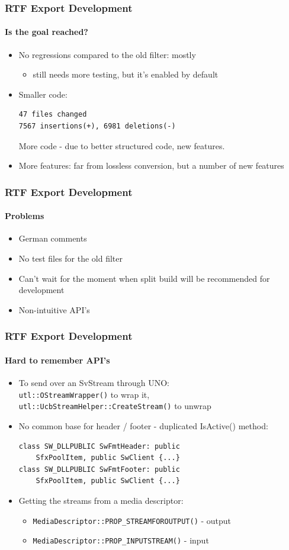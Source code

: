 \documentclass[hyperref={pdfpagelabels=false}]{beamer}
\begin{document}
\begin{frame}[fragile]
\frametitle{RTF Export Development}
\framesubtitle{Is the goal reached?}
\begin{itemize}
\item No regressions compared to the old filter: mostly
\begin{itemize}
\item still needs more testing, but it's enabled by default
\end{itemize}
\item Smaller code:
\begin{verbatim}
47 files changed
7567 insertions(+), 6981 deletions(-)
\end{verbatim}
More code - due to better structured code, new features.
\item More features: far from lossless conversion, but a number of new features
\end{itemize}
\end{frame}

\begin{frame}
\frametitle{RTF Export Development}
\framesubtitle{Problems}
\begin{itemize}
\item German comments
\item No test files for the old filter
\item Can't wait for the moment when split build will be recommended for development
\item Non-intuitive API's
\end{itemize}
\end{frame}

\begin{frame}[fragile]
\frametitle{RTF Export Development}
\framesubtitle{Hard to remember API's}
\begin{itemize}
\item To send over an SvStream through UNO: \\
\texttt{utl::OStreamWrapper()} to wrap it,
\texttt{utl::UcbStreamHelper::CreateStream()} to unwrap
\item No common base for header / footer - duplicated IsActive() method:
\begin{verbatim}
class SW_DLLPUBLIC SwFmtHeader: public
    SfxPoolItem, public SwClient {...}
class SW_DLLPUBLIC SwFmtFooter: public
    SfxPoolItem, public SwClient {...}
\end{verbatim}
\item Getting the streams from a media descriptor:
\begin{itemize}
\item \texttt{MediaDescriptor::PROP\_STREAMFOROUTPUT()} - output
\item \texttt{MediaDescriptor::PROP\_INPUTSTREAM()} - input
\end{itemize}
\end{itemize}
\end{frame}
\end{document}
